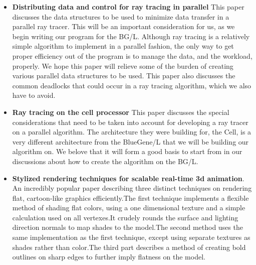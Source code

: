 \documentclass{acmsiggraph}
\begin{document}
\begin{itemize}
\item
\textbf{Distributing data and control for ray tracing in parallel} This paper
discusses the data structures to be used to minimize data transfer in a
parallel ray tracer. This will be an important consideration for us, as we
begin writing our program for the BG/L. Although ray tracing is a relatively
simple algorithm to implement in a parallel fashion, the only way to get proper
efficiency out of the program is to manage the data, and the workload,
properly. We hope this paper will relieve some of the burden of creating
various parallel data structures to be used. This paper also discusses the
common deadlocks that could occur in a ray tracing algorithm, which we also
have to avoid.\cite{badouel1994dda}
\item
\textbf{Ray tracing on the cell processor} This paper discusses the special
considerations that need to be taken into account for developing a ray tracer
on a parallel algorithm. The architecture they were building for, the Cell, is
a very different architecture from the BlueGene/L that we will be building our
algorithm on. We belove that it will form a good basis to start from in our
discussions about how to create the algorithm on the BG/L.\cite{benthin2006rtc}
\item
\textbf{Stylized rendering techniques for scalable real-time 3d animation}.
An incredibly popular paper describing three distinct techniques on rendering
flat, cartoon-like graphics efficiently.The first technique implements a
flexible method of shading flat colors, using a one dimensional texture and a
simple calculation used on all vertexes.It crudely rounds the surface and
lighting direction normals to map shades to the model.The second method uses
the same implementation as the first technique, except using separate textures
as shades rather than color.The third part describes a method of creating
bold outlines on sharp edges to further imply flatness on the
model.\cite{lake2000srt}
\end{itemize}



\end{document}
